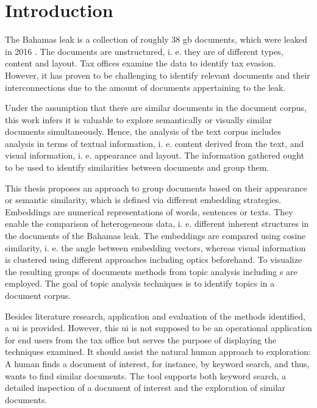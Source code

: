 \chapter{Introduction}\label{ch:introduction}

The Bahamas leak is a collection of roughly 38 \ac{gb} documents, which were leaked in 2016 \cite{data-corpus-bahamas-leaks}.
The documents are unstructured, i. e. they are of different types, content and layout.
Tax offices examine the data to identify tax evasion.
However, it has proven to be challenging to identify relevant documents and their interconnections due to the amount of documents appertaining to the leak.

Under the assumption that there are similar documents in the document corpus, 
this work infers it is valuable to explore semantically or visually similar documents simultaneously.
Hence, the analysis of the text corpus includes analysis in terms of textual information, i. e. content derived from the text, 
and visual information, i. e. appearance and layout.
The information gathered ought to be used to identify similarities between documents and group them.

This thesis proposes an approach to group documents based on their appearance or semantic similarity, 
which is defined via different embedding strategies.
Embeddings are numerical representations of words, sentences or texts.
They enable the comparison of heterogeneous data, i. e. different inherent structures in the documents of the Bahamas leak.
The embeddings are compared using cosine similarity, i. e. the angle between embedding vectors, 
whereas visual information is clustered using different approaches including \ac{optics} beforehand.
To visualize the resulting groups of documents methods from topic analysis including \wordcloud{}s are employed.
The goal of topic analysis techniques is to identify topics in a document corpus.

Besides literature research, application and evaluation of the methods identified, 
a \ac{ui} is provided.
However, this \ac{ui} is not supposed to be an operational application for end users from the tax office 
but serves the purpose of displaying the techniques examined.
It should assist the natural human approach to exploration:
A human finds a document of interest, for instance, by keyword search, and thus, wants to find similar documents.
The tool supports both keyword search, a detailed inspection of a document of interest and the exploration of similar documents.
